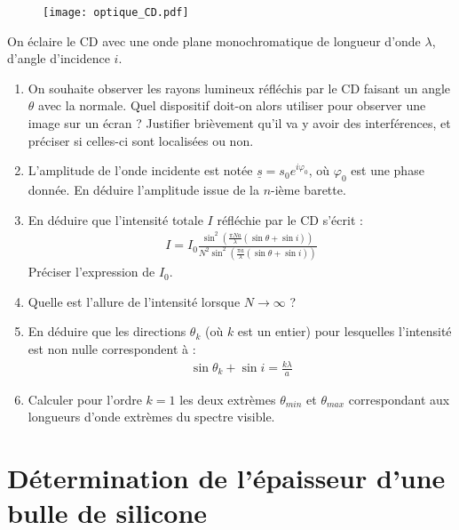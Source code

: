 \begin{figure}[h]
\centering
  \texttt{[image: optique\_CD.pdf]}
\end{figure}

On éclaire le CD avec une onde plane monochromatique de longueur d'onde $\lambda$, d'angle d'incidence $i$.

\begin{enumerate}

	\item On souhaite observer les rayons lumineux réfléchis par le CD faisant un angle $\theta$ avec la normale. Quel dispositif doit-on alors utiliser pour observer une image sur un écran ? Justifier brièvement qu'il va y avoir des interférences, et préciser si celles-ci sont localisées ou non.
	
	\item L'amplitude de l'onde incidente est notée $\underline{s}=s_0e^{i\varphi_0}$, où $\varphi_0$ est une phase donnée. En déduire l'amplitude issue de la $n$-ième barette. 
	
	\item En déduire que l'intensité totale $I$ réfléchie par le CD s'écrit :
	\begin{align*}
		I=I_0\frac{\sin^2\left( \frac{\pi N a}{\lambda}(\sin\theta+\sin i)\right)} {N^2\sin^2\left( \frac{\pi a}{\lambda}(\sin\theta+\sin i)\right) }
	\end{align*}
	Préciser l'expression de $I_0$.
	
	\item Quelle est l'allure de l'intensité lorsque $N\longrightarrow\infty$ ? 
	
	\item En déduire que les directions $\theta_k$ (où $k$ est un entier) pour lesquelles l'intensité est non nulle correspondent à :
	\begin{align*}
		\sin\theta_k+\sin i=\frac{k\lambda}{a}
	\end{align*}
	
	\item Calculer pour l'ordre $k=1$ les deux extrèmes $\theta_{min}$ et $\theta_{max}$ correspondant aux longueurs d'onde extrèmes du spectre visible.

\end{enumerate}

\newpage	

\section{Détermination de l'épaisseur d'une bulle de silicone}

